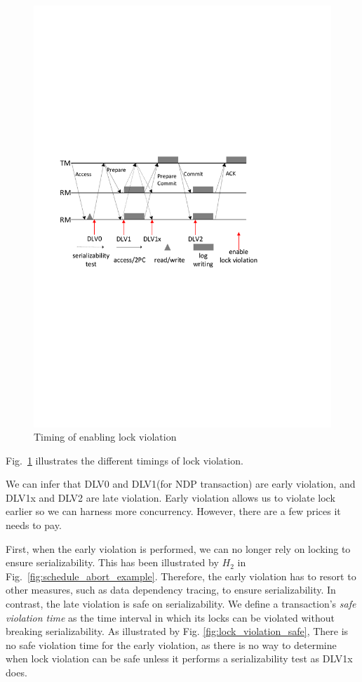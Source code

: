 \documentclass[conference]{IEEEtran}
\begin{document}
\begin{figure}[tbp]
  \centerline{\includegraphics[scale=0.50]{figure/lock_violation_time.pdf}}
  \caption
  {Timing of enabling lock violation}
\label{fig:lock_violation_time}
\end{figure}

Fig.~\ref{fig:lock_violation_time} illustrates the different timings of lock violation.

We can infer that DLV0 and DLV1(for NDP transaction) are early violation, and DLV1x and DLV2 are late violation.
Early violation allows us to violate lock earlier so we can harness more concurrency. However, there are a few prices it needs to pay.

First, when the early violation is performed, we can no longer rely on locking to ensure serializability. This has been illustrated by ${H_2}$ in Fig.~\ref{fig:schedule_abort_example}.
Therefore, the early violation has to resort to other measures, such as data dependency tracing, to ensure serializability.
In contrast, the late violation is safe on serializability.
We define a transaction's \emph{safe violation time} as the time interval in which its locks can be violated without breaking serializability.
As illustrated by Fig. \ref{fig:lock_violation_safe},
There is no safe violation time for the early violation, as there is no way to determine when lock violation can be safe unless it performs a serializability test as DLV1x does.
\end{document}

